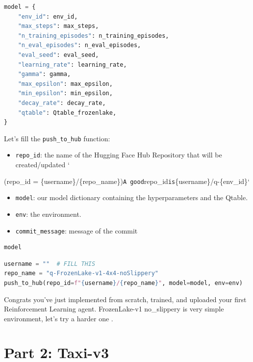 \documentclass[11pt,a4paper]{article}
\begin{document}
\begin{lstlisting}[language=Python]
model = {
    "env_id": env_id,
    "max_steps": max_steps,
    "n_training_episodes": n_training_episodes,
    "n_eval_episodes": n_eval_episodes,
    "eval_seed": eval_seed,
    "learning_rate": learning_rate,
    "gamma": gamma,
    "max_epsilon": max_epsilon,
    "min_epsilon": min_epsilon,
    "decay_rate": decay_rate,
    "qtable": Qtable_frozenlake,
}
\end{lstlisting}

Let's fill the \passthrough{\lstinline!push_to_hub!} function:

\begin{itemize}
\tightlist
\item
  \passthrough{\lstinline!repo_id!}: the name of the Hugging Face Hub Repository that will be created/updated `
\end{itemize}

(repo\_id = \{username\}/\{repo\_name\})\passthrough{\lstinline!A good!}repo\_id\passthrough{\lstinline!is!}\{username\}/q-\{env\_id\}`

\begin{itemize}
\tightlist
\item
  \passthrough{\lstinline!model!}: our model dictionary containing the hyperparameters and the Qtable.
\item
  \passthrough{\lstinline!env!}: the environment.
\item
  \passthrough{\lstinline!commit_message!}: message of the commit
\end{itemize}

\begin{lstlisting}[language=Python]
model
\end{lstlisting}

\begin{lstlisting}[language=Python]
username = ""  # FILL THIS
repo_name = "q-FrozenLake-v1-4x4-noSlippery"
push_to_hub(repo_id=f"{username}/{repo_name}", model=model, env=env)
\end{lstlisting}

Congrats you've just implemented from scratch, trained, and uploaded your first Reinforcement Learning agent. FrozenLake-v1 no\_slippery is very simple environment, let's try a harder one .

\section{Part 2: Taxi-v3}\label{part-2-taxi-v3}
\end{document}
